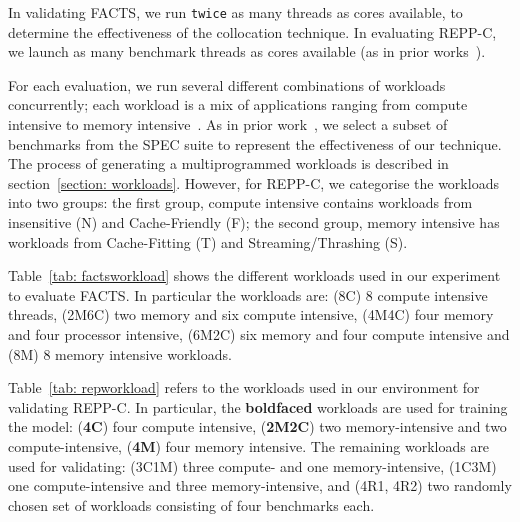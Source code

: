 In validating FACTS, we run \texttt{twice} as many threads as cores available, to
determine the effectiveness of the collocation technique.  In evaluating REPP-C, we launch
as many benchmark threads as cores available (as in prior
works~\citep{Su:2014:POP:2742155.2742200, Nishtala:SBACPAD, Nishtala:HPCA}).


 For each evaluation, we run several different combinations of workloads
concurrently; each workload is a mix of applications ranging from compute intensive to
memory intensive~\citep{2006core2}.  As in prior
work~\citep{Nishtala:2013:ETC:2555754.2555775, Zhuravlev:2013:SES:2498743.2498946,
Su:2014:POP:2742155.2742200, Zhuravlev:2012:SST:2379776.2379780,
Mars:2011:BIU:2155620.2155650, Mars:2011:DCC:1944862.1944887,
Gandhi:2010:OAE:1869138.1869264}, we select a subset of benchmarks from the SPEC suite to
represent the effectiveness of our technique.  The process of generating a multiprogrammed
workloads is described in section~\ref{section: workloads}. However, for REPP-C, we
categorise the workloads into two groups: the first group, compute intensive contains
workloads from insensitive (N) and Cache-Friendly (F); the second group, memory intensive
has workloads from Cache-Fitting (T) and Streaming/Thrashing (S).

Table~\ref{tab: factsworkload} shows the different workloads used in our experiment to
evaluate FACTS. In particular the workloads are: (\textsf{8C}) 8 compute intensive
threads, (\textsf{2M6C}) two memory and six compute intensive, (\textsf{4M4C}) four memory
and four processor intensive, (\textsf{6M2C}) six memory and four compute intensive and
(\textsf{8M}) 8 memory intensive workloads.

Table~\ref{tab: repworkload} refers to the workloads used in our environment for
validating REPP-C. In particular, the \textsf{\textbf{boldfaced}} workloads are used for
training the model: (\textsf{\textbf{4C}}) four compute intensive,
(\textsf{\textbf{2M2C}}) two memory-intensive and two compute-intensive,
(\textsf{\textbf{4M}}) four memory intensive. The remaining workloads are used for
validating: (\textsf{3C1M}) three compute- and one memory-intensive, (\textsf{1C3M}) one
compute-intensive and three memory-intensive, and (\textsf{4R1}, \textsf{4R2}) two
randomly chosen set of workloads consisting of four benchmarks each.  


